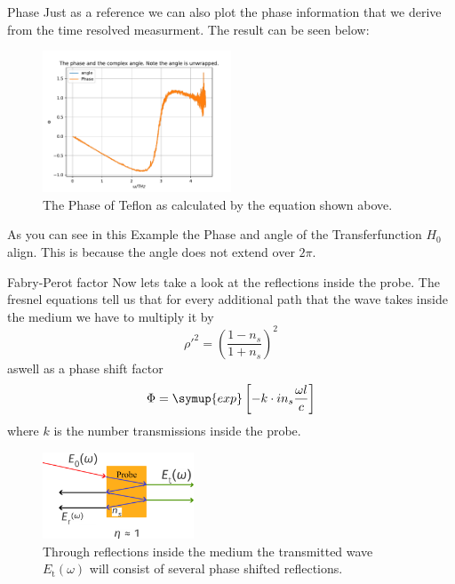 \documentclass[aspectratio=1610, 9pt]{beamer}
\begin{document}
\begin{frame}{Phase}
  Just as a reference we can also plot the phase information that we derive from the time resolved measurment.
  The result can be seen below:
  \begin{center}
    \begin{figure}
      \includegraphics[width=0.5\textwidth]{images/THzPhase.pdf}
      \caption{The Phase of Teflon as calculated by the equation shown above.}
    \end{figure}
  \end{center}
  As you can see in this Example the Phase and angle of the Transferfunction $H_0$ align.
  This is because the angle does not extend over $2\pi$.
\end{frame}


\begin{frame}{Fabry-Perot factor}
  Now lets take a look at the reflections inside the probe.
  The fresnel equations tell us that for every additional path that the wave takes inside the medium we have to multiply it by 
  \begin{equation}
    \rho'^2 = \left(\frac{1 - n_s}{1 + n_s}\right)^2
  \end{equation}
  aswell as a phase shift factor 
  \begin{equation}
    \Phi = \symup{exp}\left[-k \cdot i n_s \frac{\omega l}{c}\right]
  \end{equation}
  where $k$ is the number transmissions inside the probe.
  \begin{figure}
    \includegraphics[width=0.4\textwidth]{images/Perot.pdf}
    \caption{Through reflections inside the medium the transmitted wave $E_\text{t}(\omega)$ will consist of several phase shifted reflections.}
  \end{figure}
\end{frame}
\end{document}
